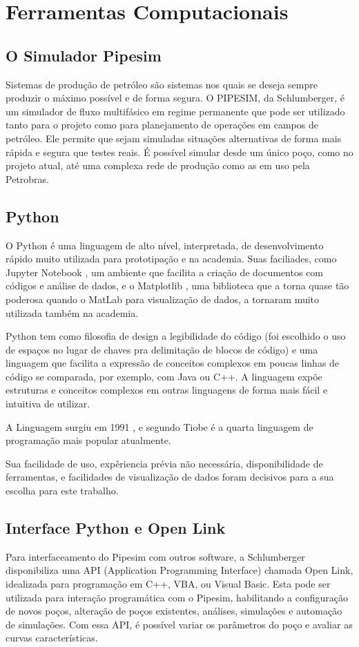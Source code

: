 
\chapter{Ferramentas Computacionais} \label{chap:4}


\section{O Simulador Pipesim}
Sistemas de produção de petróleo são sistemas nos quais se deseja sempre produzir o máximo possível e de forma segura.
O PIPESIM, da Schlumberger, é um simulador de fluxo multifásico em regime permanente que pode ser utilizado tanto para o projeto como para planejamento de operações em campos de petróleo. Ele permite que sejam simuladas situações alternativas de forma mais rápida e segura que testes reais. É possível simular desde um único poço, como no projeto atual, até uma complexa rede de produção como as em uso pela Petrobras.

\section{Python}

O Python é uma linguagem de alto nível, interpretada, de desenvolvimento rápido muito utilizada para prototipação e na academia. Suas faciliades, como Jupyter Notebook \cite{jupyter}, um ambiente que facilita a criação de documentos com códigos e análise de dados, e o Matplotlib \cite{matplotlib}, uma biblioteca que a torna quase tão poderosa quando o MatLab para visualização de dados, a tornaram muito utilizada também na academia.

Python tem como filosofia de design a legibilidade do código (foi escolhido o uso de espaços no lugar de chaves pra delimitação de blocos de código) e uma linguagem que facilita a expressão de conceitos complexos em poucas linhas de código se comparada, por exemplo, com Java ou C++. A linguagem expõe estruturas e conceitos complexos em outras linguagens de forma mais fácil e intuitiva de utilizar.

A Linguagem surgiu em 1991 \cite{pythonHistory}, e segundo Tiobe \cite{tiobe} é a quarta linguagem de programação mais popular atualmente.

Sua facilidade de uso, expêriencia prévia não necessária, disponibilidade de ferramentas, e facilidades de visualização de dados foram decisivos para a sua escolha para este trabalho. 

\section{Interface Python e Open Link}
Para interfaceamento do Pipesim com outros software, a Schlumberger disponibiliza uma API (Application Programming Interface) chamada Open Link, idealizada para programação em C++, VBA, ou Visual Basic. Esta pode ser utilizada para interação programática com o Pipesim, habilitando a configuração de novos poços, alteração de poços existentes, análises, simulações e automação de simulações. Com essa API, é possível variar os parâmetros do poço e avaliar as curvas características.




